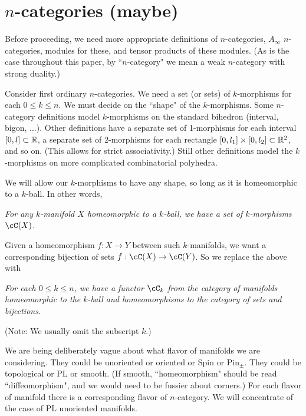 
\def\xxpar#1#2{\smallskip\noindent{\bf #1} {\it #2} \smallskip}

\section{$n$-categories (maybe)}
\label{sec:ncats}


Before proceeding, we need more appropriate definitions of $n$-categories, 
$A_\infty$ $n$-categories, modules for these, and tensor products of these modules.
(As is the case throughout this paper, by ``$n$-category" we mean
a weak $n$-category with strong duality.)

Consider first ordinary $n$-categories.
We need a set (or sets) of $k$-morphisms for each $0\le k \le n$.
We must decide on the ``shape" of the $k$-morphisms.
Some $n$-category definitions model $k$-morphisms on the standard bihedron (interval, bigon, ...).
Other definitions have a separate set of 1-morphisms for each interval $[0,l] \subset \mathbb{R}$, 
a separate set of 2-morphisms for each rectangle $[0,l_1]\times [0,l_2] \subset \mathbb{R}^2$,
and so on.
(This allows for strict associativity.)
Still other definitions 
model the $k$-morphisms on more complicated combinatorial polyhedra.

We will allow our $k$-morphisms to have any shape, so long as it is homeomorphic to a $k$-ball.
In other words,

\xxpar{Morphisms (preliminary version):}{For any $k$-manifold $X$ homeomorphic 
to a $k$-ball, we have a set of $k$-morphisms
$\cC(X)$.}

Given a homeomorphism $f:X\to Y$ between such $k$-manifolds, we want a corresponding
bijection of sets $f:\cC(X)\to \cC(Y)$.
So we replace the above with

\xxpar{Morphisms:}{For each $0 \le k \le n$, we have a functor $\cC_k$ from 
the category of manifolds homeomorphic to the $k$-ball and 
homeomorphisms to the category of sets and bijections.}

(Note: We usually omit the subscript $k$.)

We are being deliberately vague about what flavor of manifolds we are considering.
They could be unoriented or oriented or Spin or $\mbox{Pin}_\pm$.
They could be topological or PL or smooth.
(If smooth, ``homeomorphism" should be read ``diffeomorphism", and we would need
to be fussier about corners.)
For each flavor of manifold there is a corresponding flavor of $n$-category.
We will concentrate of the case of PL unoriented manifolds.


